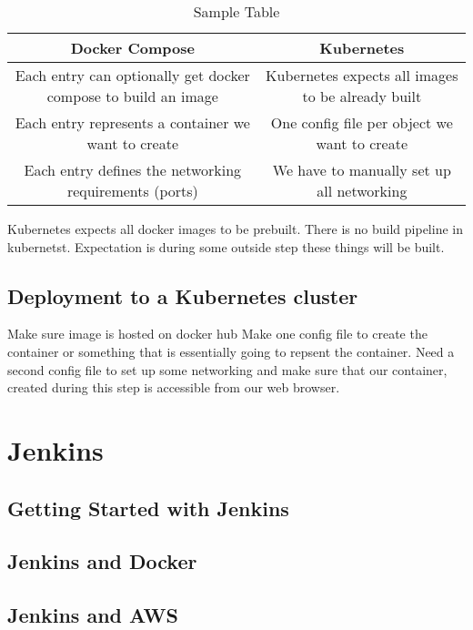 \documentclass[a4paper, 11pt]{book}
\begin{document}
    \begin{table}[h]
        \centering
        \begin{tabular}{|c|c |}
            \hline
            Docker Compose                                                 & Kubernetes                                        \\
            \hline
            Each entry can optionally get docker compose to build an image & Kubernetes expects all images to be already built \\
            Each entry represents a container we want to create            & One config file per object we want to create      \\
            Each entry defines the networking requirements (ports)         & We have to manually set up all networking         \\
            \hline
        \end{tabular}
        \caption{Sample Table}
        \label{tab:sample}
    \end{table}

    Kubernetes expects all docker images to be prebuilt. There is no build pipeline in kubernetst.
    Expectation is during some outside step these things will be built.

    \subsection{Deployment to a Kubernetes cluster}
    Make sure image is hosted on docker hub
    Make one config file to create the container or something that is essentially going to repsent the container.
    Need a second config file to set up some networking and make sure that our container, created during this step is accessible from our web browser.


    \section{Jenkins}

    \subsection{Getting Started with Jenkins}
    \subsection{Jenkins and Docker}
    \subsection{Jenkins and AWS}
\end{document}
